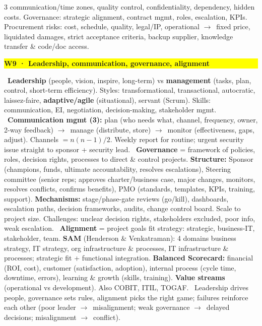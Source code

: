 \documentclass[a4paper,landscape]{article}
\newcommand{\hlhighlight}[1]{\begingroup\setlength{\fboxsep}{0pt}\colorbox{yellow}{\strut\textbf{#1}}\endgroup}
\newcommand{\concept}[1]{\textbf{#1}}
\newcommand{\lbl}[1]{\textbf{#1}}
\newcommand{\kh}[1]{{\setlength{\fboxsep}{0.5pt}\colorbox{keyhlcolor}{#1}}}
\newcommand{\ra}{$\rightarrow$}
\begin{document}
\begin{multicols}{3}
communication/time zones, quality control, confidentiality, dependency, hidden costs. Governance: strategic alignment, contract mgmt, roles, escalation, KPIs. Procurement risks: cost, schedule, quality, legal/IP, operational \ra\ fixed price, liquidated damages, strict acceptance criteria, backup supplier, knowledge transfer \& code/doc access.\par

\par\smallskip\noindent\hlhighlight{W9 · Leadership, communication, governance, alignment}\ \concept{Leadership} (people, vision, inspire, long-term) vs \concept{management} (tasks, plan, control, short-term efficiency). Styles: transformational, transactional, autocratic, laissez-faire, \lbl{adaptive/agile} (situational), servant (Scrum). Skills: communication, EI, negotiation, decision-making, stakeholder mgmt. \textbullet\ \concept{Communication mgmt (3):} plan (who needs what, channel, frequency, owner, 2-way feedback) \ra\ manage (distribute, store) \ra\ monitor (effectiveness, gaps, adjust). Channels $=n(n-1)/2$. Weekly report for routine; urgent security issue straight to sponsor + security lead. \textbullet\ \concept{Governance} = framework of policies, roles, decision rights, processes to direct \& control projects. \lbl{Structure:} \kh{Sponsor} (champions, funds, ultimate accountability, resolves escalations), \kh{Steering committee} (senior reps; approves charter/business case, major changes, monitors, resolves conflicts, confirms benefits), \kh{PMO} (standards, templates, KPIs, training, support). \lbl{Mechanisms:} stage/phase-gate reviews (go/kill), dashboards, escalation paths, decision frameworks, audits, change control board. Scale to project size. Challenges: unclear decision rights, stakeholders excluded, poor info, weak escalation. \textbullet\ \concept{Alignment} = project goals fit strategy: strategic, business-IT, stakeholder, team. \lbl{SAM} (Henderson \& Venkatraman): 4 domains business strategy, IT strategy, org infrastructure \& processes, IT infrastructure \& processes; strategic fit + functional integration. \lbl{Balanced Scorecard:} financial (ROI, cost), customer (satisfaction, adoption), internal process (cycle time, downtime, errors), learning \& growth (skills, training). \lbl{Value streams} (operational vs development). Also COBIT, ITIL, TOGAF. \textbullet\ \kh{Leadership drives people}, \kh{governance sets rules}, \kh{alignment picks the right game}; failures reinforce each other (poor leader \ra\ misalignment; weak governance \ra\ delayed decisions; misalignment \ra\ conflict).\par


\end{multicols}
\end{document}
